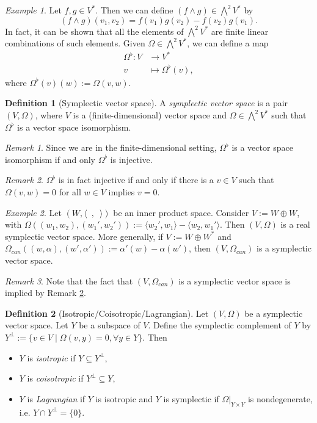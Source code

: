 \documentclass[12pt]{amsart}
\numberwithin{equation}{section}
\theoremstyle{plain}
\theoremstyle{definition}
\newtheorem{defn}{Definition}[subsection]
\theoremstyle{remark}
\newtheorem{rem}{Remark}[subsection]
\newtheorem{ex}{Example}[subsection]
\begin{document}
\begin{ex}
Let $f,g\in V^*$. Then we can define $(f\land g)\in \bigwedge^2 V^*$ by 
\[
(f\land g)(v_1,v_2)=f(v_1)g(v_2)-f(v_2)g(v_1).
\]
In fact, it can be shown that all the elements of $\bigwedge^2V^*$ are finite linear combinations of such elements. Given $\Omega\in \bigwedge^2 V^*$, we can define a map
\begin{align*}
\Omega^\flat\colon V&\to V^*\\
v&\mapsto \Omega^\flat(v),
\end{align*}
where $\Omega^\flat(v)(w):=\Omega(v,w)$.
\end{ex}

\begin{defn}[Symplectic vector space]
A \emph{symplectic vector space} is a pair $(V,\Omega)$, where $V$ is a (finite-dimensional) vector space and $\Omega\in\bigwedge^2 V^*$ such that $\Omega^\flat$ is a vector space isomorphism.
\end{defn}

\begin{rem}
Since we are in the finite-dimensional setting, $\Omega^\flat$ is a vector space isomorphism if and only $\Omega^\flat$ is injective.
\end{rem}

\begin{rem}
\label{rem1}
$\Omega^\flat$ is in fact injective if and only if there is a $v\in V$ such that $\Omega(v,w)=0$ for all $w\in V$ implies $v=0$.
\end{rem}

\begin{ex}
Let $(W,\langle\enspace,\enspace\rangle)$ be an inner product space. Consider $V:=W\oplus W$, with $\Omega((w_1,w_2),(w_1',w_2')):=\langle w_2',w_1\rangle-\langle w_2,w_1'\rangle$. Then $(V,\Omega)$ is a real symplectic vector space. More generally, if $V:=W\oplus W^*$ and $\Omega_{can}((w,\alpha),(w',\alpha')):=\alpha'(w)-\alpha(w')$, then $(V,\Omega_{can})$ is a symplectic vector space.
\end{ex}

\begin{rem}
Note that the fact that $(V,\Omega_{can})$ is a symplectic vector space is implied by Remark \ref{rem1}.
\end{rem}


\begin{defn}[Isotropic/Coisotropic/Lagrangian]
Let $(V,\Omega)$ be a symplectic vector space. Let $Y$ be a subspace of $V$. Define the symplectic complement of $Y$ by $Y^{\perp}:=\{v\in V\mid \Omega(v,y)=0,\forall y\in Y\}$. Then 
\begin{itemize}
\item{$Y$ is \emph{isotropic} if $Y\subseteq Y^\perp$,
}
\item{$Y$ is \emph{coisotropic} if $Y^\perp\subseteq Y$,}
\item{$Y$ is \emph{Lagrangian} if $Y$ is isotropic and $Y$ is symplectic if $\Omega\big|_{Y\times Y}$ is nondegenerate, i.e. $Y\cap Y^\perp=\{0\}$.}
\end{itemize}
\end{defn}
\end{document}
